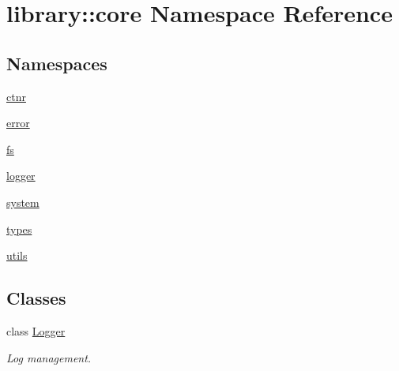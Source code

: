 \hypertarget{namespacelibrary_1_1core}{}\section{library\+:\+:core Namespace Reference}
\label{namespacelibrary_1_1core}
\subsection*{Namespaces}
\begin{DoxyCompactItemize}
\item 
 \hyperlink{namespacelibrary_1_1core_1_1ctnr}{ctnr}
\item 
 \hyperlink{namespacelibrary_1_1core_1_1error}{error}
\item 
 \hyperlink{namespacelibrary_1_1core_1_1fs}{fs}
\item 
 \hyperlink{namespacelibrary_1_1core_1_1logger}{logger}
\item 
 \hyperlink{namespacelibrary_1_1core_1_1system}{system}
\item 
 \hyperlink{namespacelibrary_1_1core_1_1types}{types}
\item 
 \hyperlink{namespacelibrary_1_1core_1_1utils}{utils}
\end{DoxyCompactItemize}
\subsection*{Classes}
\begin{DoxyCompactItemize}
\item 
class \hyperlink{classlibrary_1_1core_1_1_logger}{Logger}
\begin{DoxyCompactList}\small\item\em Log management. \end{DoxyCompactList}\end{DoxyCompactItemize}
